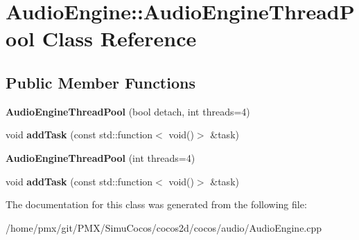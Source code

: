 \hypertarget{classAudioEngine_1_1AudioEngineThreadPool}{}\section{Audio\+Engine\+:\+:Audio\+Engine\+Thread\+Pool Class Reference}
\label{classAudioEngine_1_1AudioEngineThreadPool}
\subsection*{Public Member Functions}
\begin{DoxyCompactItemize}
\item 
\mbox{\label{classAudioEngine_1_1AudioEngineThreadPool_a21ea0353504b51fb6ff8c9a3917b0328}} 
{\bfseries Audio\+Engine\+Thread\+Pool} (bool detach, int threads=4)
\item 
\mbox{\label{classAudioEngine_1_1AudioEngineThreadPool_aba9f61e8ecff2e493cd6d5d45a261db0}} 
void {\bfseries add\+Task} (const std\+::function$<$ void()$>$ \&task)
\item 
\mbox{\label{classAudioEngine_1_1AudioEngineThreadPool_a17322ca8ce2ecb19662138fe002d7161}} 
{\bfseries Audio\+Engine\+Thread\+Pool} (int threads=4)
\item 
\mbox{\label{classAudioEngine_1_1AudioEngineThreadPool_aba9f61e8ecff2e493cd6d5d45a261db0}} 
void {\bfseries add\+Task} (const std\+::function$<$ void()$>$ \&task)
\end{DoxyCompactItemize}


The documentation for this class was generated from the following file\+:\begin{DoxyCompactItemize}
\item 
/home/pmx/git/\+P\+M\+X/\+Simu\+Cocos/cocos2d/cocos/audio/Audio\+Engine.\+cpp\end{DoxyCompactItemize}
